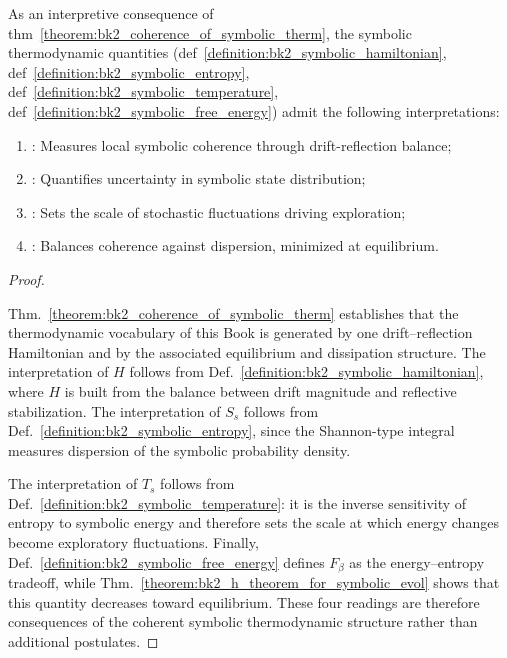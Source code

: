 \begin{corollary} 
\label{corollary:bk2_interpretative_framework} 
As an interpretive consequence of thm~\ref{theorem:bk2_coherence_of_symbolic_therm}, the symbolic thermodynamic quantities (def~\ref{definition:bk2_symbolic_hamiltonian}, def~\ref{definition:bk2_symbolic_entropy}, def~\ref{definition:bk2_symbolic_temperature}, def~\ref{definition:bk2_symbolic_free_energy}) admit the following interpretations:
\begin{enumerate}
    \item[\textbf{Hamiltonian $H$}]: Measures local symbolic coherence through drift-reflection balance;
    \item[\textbf{Entropy $S_s$}]: Quantifies uncertainty in symbolic state distribution;
    \item[\textbf{Temperature $T_s$}]: Sets the scale of stochastic fluctuations driving exploration;
    \item[\textbf{Free Energy $F_\beta$}]: Balances coherence against dispersion, minimized at equilibrium.
\end{enumerate}
\end{corollary}

\begin{proof}
\label{proof:bk2_interpretative_framework}
\leavevmode

Thm.~\ref{theorem:bk2_coherence_of_symbolic_therm} establishes that the
thermodynamic vocabulary of this Book is generated by one drift--reflection
Hamiltonian and by the associated equilibrium and dissipation structure. The
interpretation of $H$ follows from Def.~\ref{definition:bk2_symbolic_hamiltonian},
where $H$ is built from the balance between drift magnitude and reflective
stabilization. The interpretation of $S_s$ follows from
Def.~\ref{definition:bk2_symbolic_entropy}, since the Shannon-type integral
measures dispersion of the symbolic probability density.

The interpretation of $T_s$ follows from Def.~\ref{definition:bk2_symbolic_temperature}:
it is the inverse sensitivity of entropy to symbolic energy and therefore sets
the scale at which energy changes become exploratory fluctuations. Finally,
Def.~\ref{definition:bk2_symbolic_free_energy} defines $F_\beta$ as the
energy--entropy tradeoff, while Thm.~\ref{theorem:bk2_h_theorem_for_symbolic_evol}
shows that this quantity decreases toward equilibrium. These four readings are
therefore consequences of the coherent symbolic thermodynamic structure rather
than additional postulates.
\end{proof}


